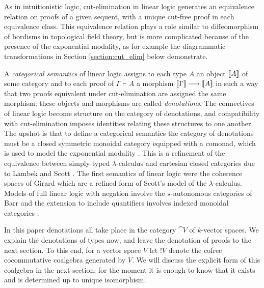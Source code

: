 \documentclass[english,letter paper,12pt,reqno]{article}
\theoremstyle{example}
\numberwithin{equation}{section}
\begin{document}
As in intuitionistic logic, cut-elimination in linear logic generates an equivalence relation on proofs of a given sequent, with a unique cut-free proof in each equivalence class. This equivalence relation plays a role similar to diffeomorphism of bordisms in topological field theory, but is more complicated because of the presence of the exponential modality, as for example the diagrammatic transformations in Section \ref{section:cut_elim} below demonstrate. %

A \emph{categorical semantics} of linear logic \cite{mellies, blue_book} assigns to each type $A$ an object $\llbracket A \rrbracket$ of some category and to each proof of $\Gamma \vdash A$ a morphism $\llbracket \Gamma \rrbracket \longrightarrow \llbracket A \rrbracket$ in such a way that two proofs equivalent under cut-elimination are assigned the same morphism; these objects and morphisms are called \emph{denotations}. The connectives of linear logic become structure on the category of denotations, and compatibility with cut-elimination imposes identities relating these structures to one another. The upshot is that to define a categorical semantics the category of denotations must be a closed symmetric monoidal category equipped with a comonad, which is used to model the exponential modality \cite[\S 7]{mellies}. This is a refinement of the equivalence between simply-typed $\lambda$-calculus and cartesian closed categories due to Lambek and Scott \cite{lambek}. The first semantics of linear logic were the coherence spaces of Girard \cite[\S 3]{girard_llogic} which are a refined form of Scott's model of the $\lambda$-calculus. Models of full linear logic with negation involve the $\star$-autonomous categories of Barr \cite{barr_auto,barr_acc,barr_autolin} and the extension to include quantifiers involves indexed monoidal categories \cite{seely}.

In this paper denotations all take place in the category $\cat{V}$ of $k$-vector spaces. We explain the denotations of types now, and leave the denotation of proofs to the next section. To this end, for a vector space $V$ let ${!} V$ denote the cofree cocommutative coalgebra generated by $V$. We will discuss the explicit form of this coalgebra in the next section; for the moment it is enough to know that it exists and is determined up to unique isomorphism.
\end{document}
